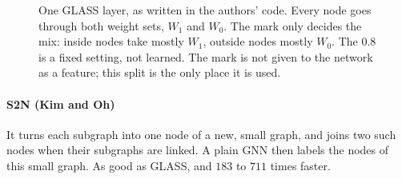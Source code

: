 \documentclass[11pt]{article}
\begin{document}
\begin{figure}[H]
\caption{One GLASS layer, as written in the authors' code. Every node goes through both weight
sets, $W_1$ and $W_0$. The mark only decides the mix: inside nodes take mostly $W_1$, outside
nodes mostly $W_0$. The $0.8$ is a fixed setting, not learned. The mark is not given to the
network as a feature; this split is the only place it is used.}
\end{figure}

\paragraph{S2N (Kim and Oh)} It turns each subgraph into one node of a new, small graph, and
joins two such nodes when their subgraphs are linked. A plain GNN then labels the nodes of
this small graph. As good as GLASS, and $183$ to $711$ times faster.
\end{document}
